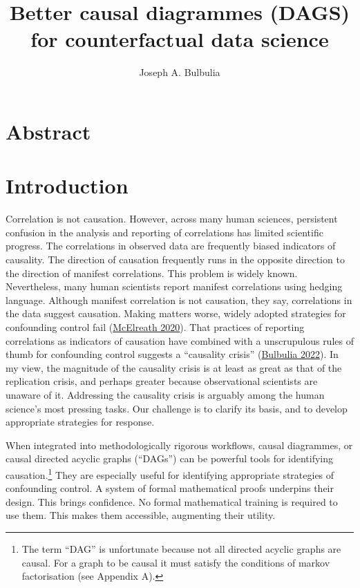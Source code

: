 \documentclass[
  singlecolumn]{report}
\title{Better causal diagrammes (DAGS) for counterfactual data science}
\author{Joseph A. Bulbulia}
\date{}
\begin{document}
\maketitle
\ifdefined\Shaded\renewenvironment{Shaded}{\begin{tcolorbox}[sharp corners, frame hidden, boxrule=0pt, borderline west={3pt}{0pt}{shadecolor}, interior hidden, enhanced, breakable]}{\end{tcolorbox}}\fi

\listoffigures
\listoftables
\hypertarget{abstract}{%
\section{Abstract}\label{abstract}}

\hypertarget{introduction}{%
\section{Introduction}\label{introduction}}

Correlation is not causation. However, across many human sciences,
persistent confusion in the analysis and reporting of correlations has
limited scientific progress. The correlations in observed data are
frequently biased indicators of causality. The direction of causation
frequently runs in the opposite direction to the direction of manifest
correlations. This problem is widely known. Nevertheless, many human
scientists report manifest correlations using hedging language. Although
manifest correlation is not causation, they say, correlations in the
data suggest causation. Making matters worse, widely adopted strategies
for confounding control fail
(\protect\hyperlink{ref-mcelreath2020}{McElreath 2020}). That practices
of reporting correlations as indicators of causation have combined with
a unscrupulous rules of thumb for confounding control suggests a
``causality crisis'' (\protect\hyperlink{ref-bulbulia2022}{Bulbulia
2022}). In my view, the magnitude of the causality crisis is at least as
great as that of the replication crisis, and perhaps greater because
observational scientists are unaware of it. Addressing the causality
crisis is arguably among the human science's most pressing tasks. Our
challenge is to clarify its basis, and to develop appropriate strategies
for response.

When integrated into methodologically rigorous workflows, causal
diagrammes, or causal directed acyclic graphs (``DAGs'') can be powerful
tools for identifying causation.\footnote{The term ``DAG'' is
  unfortunate because not all directed acyclic graphs are causal. For a
  graph to be causal it must satisfy the conditions of markov
  factorisation (see Appendix A).} They are especially useful for
identifying appropriate strategies of confounding control. A system of
formal mathematical proofs underpins their design. This brings
confidence. No formal mathematical training is required to use them.
This makes them accessible, augmenting their utility.
\end{document}
